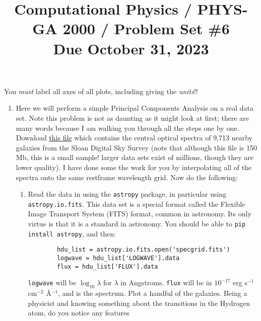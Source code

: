 \documentclass[11pt, preprint]{aastex}
\begin{document}
\title{\bf Computational Physics / PHYS-GA 2000 / Problem Set \#6
\\ Due October 31, 2023 }

You {\it must} label all axes of all plots, including giving the {\it
  units}!!

\begin{enumerate}
\item Here we will perform a simple Principal Components Analysis on a
  real data set. Note this problem is not as daunting as it might look
  at first; there are many words because I am walking you through all
  the steps one by one.  Download
  \href{https://www.dropbox.com/scl/fi/9cmawl762qtuwiouhmafs/specgrid.fits?rlkey=d2zcco18t5vfbib5nuxmsu411&dl=0}{this
    file} which contains the central optical spectra of 9,713 nearby
  galaxies from the Sloan Digital Sky Survey (note that although this
  file is 150 Mb, this is a small sample!  larger data sets exist of
  millions, though they are lower quality). I have done some the work
  for you by interpolating all of the spectra onto the same restframe
  wavelength grid. Now do the following:
  \begin{enumerate}
    \item Read the data in using the {\tt astropy} package, in
      particular using {\tt astropy.io.fits}. This data set is a
      special format called the Flexible Image Transport System (FITS)
      format, common in astronomy. Its only virtue is that it is a
      standard in astronomy. You should be able to {\tt pip install
        astropy}, and then:
      \begin{verbatim}
        hdu_list = astropy.io.fits.open('specgrid.fits')
        logwave = hdu_list['LOGWAVE'].data
        flux = hdu_list['FLUX'].data
      \end{verbatim}
      {\tt logwave} will be $\log_{10}\lambda$ for $\lambda$ in
      Angstroms. {\tt flux} will be in $10^{-17}$ erg s$^{-1}$
      cm$^{-2}$ \AA$^{-1}$, and is the spectrum. Plot a handful of the
      galaxies. Being a physicist and knowing something about the
      transitions in the Hydrogen atom, do you notice any features

\end{enumerate}
\end{enumerate}
\end{document}
